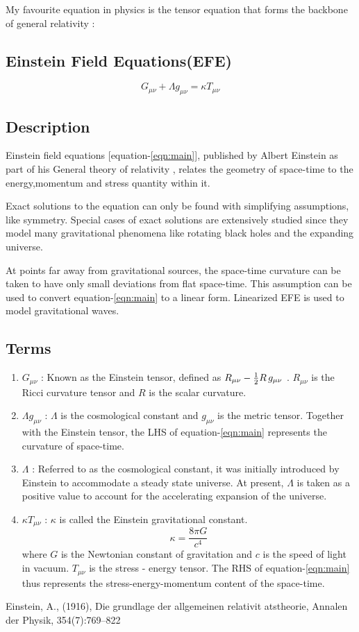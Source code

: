 My favourite equation in physics is the tensor equation that forms the backbone of general relativity :
\subsection{Einstein Field Equations(EFE)} 

\begin{equation}
{  G_{\mu \nu}  } + {  \Lambda g_{\mu \nu}  } = {\kappa T_{\mu \nu}}
\label{eqn:main}
\end{equation}

\subsection{Description}

Einstein field equations [equation-\ref{eqn:main}], published by Albert Einstein as part of his General theory of relativity \cite{Einstein}, relates the geometry of space-time to the energy,momentum and stress quantity within it. 

Exact solutions to the equation can only be found with simplifying assumptions, like symmetry. Special cases of exact solutions are extensively studied since they model many gravitational phenomena like rotating black holes and the expanding universe. 

At points far away from gravitational sources, the space-time curvature can be taken to have only small deviations from flat space-time. This assumption can be used to convert equation-\ref{eqn:main} to a linear form. Linearized EFE is used to model gravitational waves.

\subsection{Terms}

\begin{enumerate}
    \item $ G_{\mu \nu} $ : Known as the Einstein tensor, defined as $ R_{\mu \nu} - {1 \over 2}R \, g_{\mu \nu} $ . $ R_{\mu \nu} $ is the Ricci curvature tensor and $ R $ is the scalar curvature. 
    \item $ \Lambda g_{\mu \nu} $ : $ \Lambda $ is the cosmological  constant and $ g_{\mu \nu} $ is the metric tensor. Together with the Einstein tensor, the LHS of equation-\ref{eqn:main} represents the curvature of space-time.
    \item $ \Lambda $ : Referred to as the cosmological constant, it was initially introduced by Einstein to accommodate a steady state universe. At present, $ \Lambda $ is taken as a positive value to account for the accelerating expansion of the universe.
    \item $ \kappa T_{\mu \nu} $ : $ \kappa $ is called the Einstein gravitational constant. $$ \kappa = \frac{8 \pi G }{ c^4} \label{eqn:2}$$ where $ G $ is the Newtonian constant of gravitation and $ c $ is the speed of light in vacuum. $  T_{\mu \nu} $ is the stress - energy tensor. The RHS of equation-\ref{eqn:main} thus represents the stress-energy-momentum content of the space-time.
\end{enumerate}

\begin{thebibliography}{1}

 Einstein, A., (1916), Die      grundlage der allgemeinen relativit atstheorie, Annalen der Physik, 354(7):769–822

\end{thebibliography}
